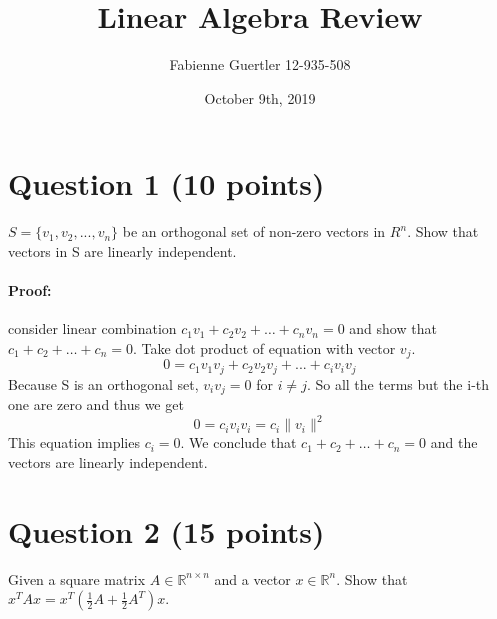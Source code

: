 \documentclass[
	10pt, %
]{../fphw}
\title{Linear Algebra Review} %
\author{Fabienne Guertler 12-935-508} %
\date{October 9th, 2019} %
\institute{University of Bern} %
\begin{document}
	\maketitle
	\section*{Question 1 (10 points)}
	\begin{problem}
		$S = \{v_1,v_2,...,v_n\}$ be an orthogonal set of non-zero vectors in $R^n$. Show that vectors in S are linearly independent.
	\end{problem}
	\paragraph{Proof:} consider linear combination $c_1v_1 + c_2v_2 + … + c_nv_n = 0$ and show that $c_1 + c_2 + … + c_n = 0$. Take dot product of equation with vector $v_j$.
	\begin{equation*}
		0 = c_1 v_1 v_j + c_2 v_2 v_j + ... + c_i v_i v_j
	\end{equation*}
	Because S is an orthogonal set, $v_i v_j = 0$ for $i \neq j$. So all the terms but the i-th one are zero and thus we get
	\begin{equation*}
		0 = c_i v_i v_i = c_i \| v_i \|^2
	\end{equation*}
	This equation implies $c_i = 0$. We conclude that $c_1 + c_2 + … + c_n = 0$ and the vectors are linearly independent.
	
	\section*{Question 2 (15 points)}
	\begin{problem}
		Given a square matrix $A \in \mathbb{R}^{n \times n} $ and a vector $x \in \mathbb{R}^n$. Show that $x^TAx = x^T(\frac{1}{2}A + \frac{1}{2}A^T)x$.
	\end{problem}
\end{document}
